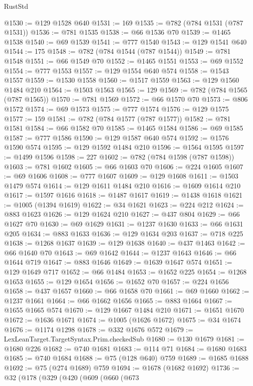 \begin{lexlean}{RustStd}
\begin{coremodule}
{\begin{coremodule}
{{{{{{{{{{{{{{{{{{{{{{{{{{{{{{{{{{{{{{{{{{{@1530 := @129 @1528 @640
@1531 := 169
@1535 := @782 (@784 @1531 (@787 @1531))
@1536 := @781 @1535
@1538 := @66 @1536 @70
@1539 := @1465 @1538
@1540 := @69 @1539
@1541 := @777 @1540
@1543 := @129 @1541 @640
@1544 := 175
@1548 := @782 (@784 @1544 (@787 @1544))
@1549 := @781 @1548
@1551 := @66 @1549 @70
@1552 := @1465 @1551
@1553 := @69 @1552
@1554 := @777 @1553
@1557 := @129 @1554 @640 @574
@1558 := @1543 @1557
@1559 := @1530 @1558
@1560 := @1517 @1559
@1563 := @129 @1560 @1484 @210
@1564 := @1503 @1563
@1565 := 129
@1569 := @782 (@784 @1565 (@787 @1565))
@1570 := @781 @1569
@1572 := @66 @1570 @70
@1573 := @806 @1572
@1574 := @69 @1573
@1575 := @777 @1574
@1576 := @129 @1575
@1577 := 159
@1581 := @782 (@784 @1577 (@787 @1577))
@1582 := @781 @1581
@1584 := @66 @1582 @70
@1585 := @1465 @1584
@1586 := @69 @1585
@1587 := @777 @1586
@1590 := @129 @1587 @640 @574
@1592 := @1576 @1590 @574
@1595 := @129 @1592 @1484 @210
@1596 := @1564 @1595
@1597 := @1499 @1596
@1598 := 227
@1602 := @782 (@784 @1598 (@787 @1598))
@1603 := @781 @1602
@1605 := @66 @1603 @70
@1606 := @224 @1605
@1607 := @69 @1606
@1608 := @777 @1607
@1609 := @129 @1608
@1611 := @1503 @1479 @574
@1614 := @129 @1611 @1484 @210
@1616 := @1609 @1614 @210
@1617 := @1597 @1616
@1618 := @1487 @1617
@1619 := @1438 @1618
@1621 := @1005 (@1394 @1619)
@1622 := @34 @1621
@1623 := @224 @212
@1624 := @883 @1623
@1626 := @129 @1624 @210
@1627 := @437 @804
@1629 := @66 @1627 @70
@1630 := @69 @1629
@1631 := @1237 @1630
@1633 := @66 @1631 @205
@1634 := @883 @1633
@1636 := @129 @1634 @203
@1637 := @718 @225
@1638 := @1268 @1637
@1639 := @129 @1638
@1640 := @437 @1463
@1642 := @66 @1640 @70
@1643 := @69 @1642
@1644 := @1237 @1643
@1646 := @66 @1644 @719
@1647 := @883 @1646
@1649 := @1639 @1647 @574
@1651 := @129 @1649 @717
@1652 := @66 @1484
@1653 := @1652 @225
@1654 := @1268 @1653
@1655 := @129 @1654
@1656 := @1652 @70
@1657 := @224 @1656
@1658 := @437 @1657
@1660 := @66 @1658 @70
@1661 := @69 @1660
@1662 := @1237 @1661
@1664 := @66 @1662 @1656
@1665 := @883 @1664
@1667 := @1655 @1665 @574
@1670 := @129 @1667 @1484 @210
@1671 := @1651 @1670
@1672 := @1636 @1671
@1674 := @1005 (@1626 @1672)
@1675 := @34 @1674
@1676 := @1174 @1298
@1678 := @332 @1676 @572
@1679 := LexLeanTarget.TargetSyntax.Prim.checkedSub
@1680 := @130 @1679
@1681 := @1680 @226
@1682 := @740 @1681
@1683 := @114 @71
@1684 := @1680 @1683
@1685 := @740 @1684
@1688 := @75 (@128 @640) @759
@1689 := @1685 @1688
@1692 := @75 (@274 @1689) @759
@1694 := @1678 (@1682 @1692)
@1736 := @32
    (@178
      (@329
        (@420
          (@609
            (@660
              (@673
}}}}}}}}}}}}}}}}}}}}}}}}}}}}}}}}}}}}}}}}}}}
\end{coremodule}}
\end{coremodule}
\end{lexlean}
